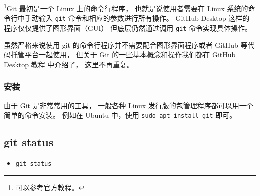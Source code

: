 
\begin{issues}
\issueDraft
\end{issues}


\footnote{可以参考\href{https://git-scm.com/book/en/v2}{官方教程}。}Git 最初是一个 Linux 上的命令行程序， 也就是说使用者需要在 Linux 系统的命令行中手动输入 \verb|git| 命令和相应的参数进行所有操作。 GitHub Desktop 这样的程序仅仅提供了图形界面（GUI） 但底层仍然通过调用 \verb|git| 命令实现具体操作。

虽然严格来说使用 git 的命令行程序并不需要配合图形界面程序或者 GitHub 等代码托管平台一起使用， 但关于 Git 的一些基本概念和操作我们都在 GitHub Desktop 教程 中介绍了， 这里不再重复。

\subsubsection{安装}
由于 Git 是非常常用的工具， 一般各种 Linux 发行版的包管理程序都可以用一个简单的命令安装。 例如在 Ubuntu 中，使用 \verb|sudo apt install git| 即可。

\subsection{git status}
\begin{itemize}
\item \verb|git status|
\end{itemize}
